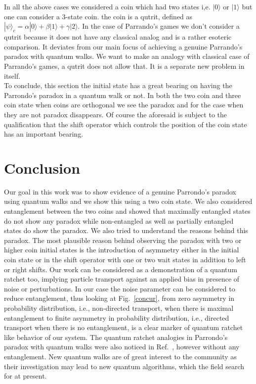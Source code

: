 \documentclass[english,aps,pra,amsmath,amssymb,showpacs,notitlepage,onecolumn]{revtex4-1}
\begin{document}
In all the above cases we considered a coin which had two states i,e. $|0 \rangle$ or $|1 \rangle$ but one can consider a 3-state coin. the coin is a qutrit, defined as $| \psi \rangle_c= \alpha|0\rangle + \beta|1 \rangle + \gamma|2 \rangle$. In the case of Parrando's games we don't consider a qutrit because it does not have any classical analog and is a rather esoteric comparison. It deviates from our main focus of achieving a genuine Parrando's paradox with quantum walks. We want to make an analogy with classical case of Parrando's games, a qutrit does not allow that. It is a separate new problem in itself.\\

To conclude, this section the initial state has a great bearing on having the Parrondo's paradox in a quantum walk or not. In both the two coin and three coin state when coins are orthogonal we see the paradox and for the case when they are not paradox disappears. Of course the aforesaid is subject to the qualification that the shift operator which controls the position of the coin state has an important bearing. 
\section{Conclusion}
Our goal in this work was to show evidence of a genuine Parrondo's paradox using quantum walks and we show this using a two coin state. We also considered entanglement between the two coins and showed that maximally entangled states do not show any paradox while non-entangled as well as partially entangled states do show the paradox. We also tried to understand the reasons behind this paradox. The most plausible reason behind observing the paradox with two or higher coin initial states is the introduction of  asymmetry either in the initial coin state or in the shift operator with one or two wait states in addition to left or right shifts. Our work can be considered as a demonstration of a  quantum ratchet too, implying particle transport against an applied bias in presence of noise or perturbations. In our case the noise parameter can be considered to reduce entanglement, thus looking at Fig.~\ref{concur}, from zero asymmetry in probability distribution, i.e., non-directed transport, when there is maximal entanglement to finite asymmetry in probability distribution, i.e., directed transport when there is no entanglement, is a clear marker of quantum ratchet like behavior of our system. The quantum ratchet analogies in Parrondo's paradox with quantum walks were also noticed in Ref.~\cite{Meyer}, however without any entanglement. New quantum walks are of great interest to the community as their investigation may lead to new quantum algorithms, which the field search for at present.
\end{document}
